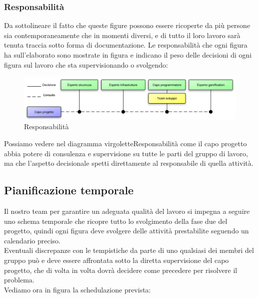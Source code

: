 \subsubsection{Responsabilità}
Da sottolineare il fatto che queste figure possono essere ricoperte da più persone sia contemporaneamente che in momenti diversi, e di tutto il loro lavoro sarà tenuta traccia sotto forma di documentazione.
Le responsabilità che ogni figura ha sull'elaborato sono mostrate in figura  e indicano il peso delle decisioni di ogni figura sul lavoro che sta supervisionando o svolgendo:

\vspace*{0.5cm}

\begin{figure}[H]
\centering
\includegraphics[scale=0.7]{images/resp.png}
\caption{Responsabilità}
\end{figure}

\vspace*{0.5cm}

Possiamo vedere nel diagramma virgolette{Responsabilità} come il capo progetto abbia potere di consulenza e supervisione su tutte le parti del gruppo di lavoro, ma che l'aspetto decisionale spetti direttamente al responsabile di quella attività.

\newpage

\subsection{Pianificazione temporale}

Il nostro team per garantire un adeguata qualità del lavoro si impegna a seguire uno schema temporale che ricopre tutto lo svolgimento della fase due del progetto, quindi ogni figura deve svolgere delle attività prestabilite seguendo un calendario preciso. \\Eventuali discrepanze con le tempistiche da parte di uno qualsiasi dei membri del gruppo può e deve essere affrontata sotto la diretta supervisione del capo progetto, che di volta in volta dovrà decidere come precedere per risolvere il problema. \\Vediamo ora in figura  la schedulazione prevista:

